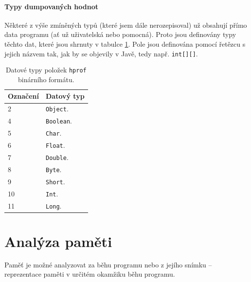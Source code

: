 \subsubsection{Typy dumpovaných hodnot}
Některé z výše zmíněných typů (které jsem dále nerozepisoval) už obsahují přímo data programu (ať už uživatelská nebo pomocná). Proto jsou definovány typy těchto dat, které jsou shrnuty v tabulce \ref{table-hprof-data-types}. Pole jsou definována pomocí řetězcu s jejich názvem tak, jak by se objevily v Javě, tedy např. \texttt{int[][]}.
\begin{table}[ht!]
    \begin{tabularx}{\textwidth}{|l|X|}
        \hline
    \textbf{Označení} & \textbf{Datový typ} \\ \hline \hline
    2 & \texttt{Object}. \\
    4 & \texttt{Boolean}. \\
    5 & \texttt{Char}. \\
    6 & \texttt{Float}. \\
    7 & \texttt{Double}. \\
    8 & \texttt{Byte}. \\
    9 & \texttt{Short}. \\
    10 & \texttt{Int}. \\
    11 & \texttt{Long}. \\ \hline
    \end{tabularx}
    \caption{Datové typy položek \texttt{hprof} binárního formátu.}
    \label{table-hprof-data-types}
\end{table}




\chapter{Analýza paměti}

Paměť je možné analyzovat za běhu programu nebo z jejího snímku -- reprezentace paměti v určitém okamžiku běhu programu.

